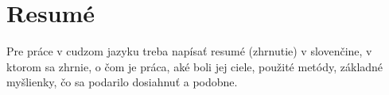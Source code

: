 \thispagestyle{empty}

\chapter*{Resumé}

Pre práce v cudzom jazyku treba napísať resumé (zhrnutie) v slovenčine, v ktorom sa zhrnie, o čom je práca, aké boli jej ciele, použité metódy, základné myšlienky, čo sa podarilo dosiahnuť a podobne.

\cleardoublepage

